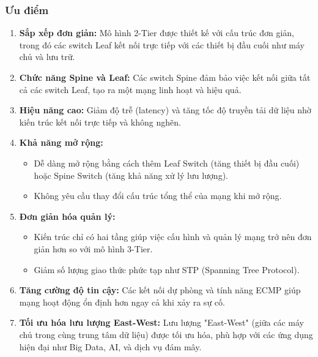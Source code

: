 \documentclass[13pt]{article}
\begin{document}
\subsubsection{Ưu điểm}
\begin{enumerate}
    \item \textbf{Sắp xếp đơn giản: }Mô hình 2-Tier được thiết kế với cấu trúc đơn giản, trong đó các switch Leaf kết nối trực tiếp với các thiết bị đầu cuối như máy chủ và lưu trữ.

    \item \textbf{Chức năng Spine và Leaf: }Các switch Spine đảm bảo việc kết nối giữa tất cả các switch Leaf, tạo ra một mạng linh hoạt và hiệu quả.

    \item \textbf{Hiệu năng cao: }Giảm độ trễ (latency) và tăng tốc độ truyền tải dữ liệu nhờ kiến trúc kết nối trực tiếp và không nghẽn.

    \item \textbf{Khả năng mở rộng:}
    \begin{itemize}
        \item Dễ dàng mở rộng bằng cách thêm Leaf Switch (tăng thiết bị đầu cuối) hoặc Spine Switch (tăng khả năng xử lý lưu lượng).
        \item Không yêu cầu thay đổi cấu trúc tổng thể của mạng khi mở rộng.
    \end{itemize}

    \item \textbf{Đơn giản hóa quản lý:}
    \begin{itemize}
        \item Kiến trúc chỉ có hai tầng giúp việc cấu hình và quản lý mạng trở nên đơn giản hơn so với mô hình 3-Tier.
        \item Giảm số lượng giao thức phức tạp như STP (Spanning Tree Protocol).
    \end{itemize}

    \item \textbf{Tăng cường độ tin cậy: }Các kết nối dự phòng và tính năng ECMP giúp mạng hoạt động ổn định hơn ngay cả khi xảy ra sự cố.

    \item \textbf{Tối ưu hóa lưu lượng East-West: }Lưu lượng "East-West" (giữa các máy chủ trong cùng trung tâm dữ liệu) được tối ưu hóa, phù hợp với các ứng dụng hiện đại như Big Data, AI, và dịch vụ đám mây.
\end{enumerate}
\end{document}

